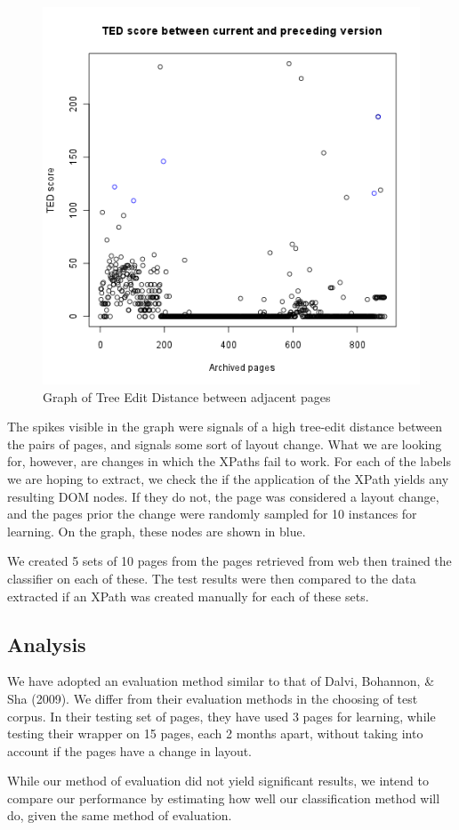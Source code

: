 \begin{figure}[htbp]
\centering
\includegraphics[scale=0.6]{scoregraph.png} 
\caption{Graph of Tree Edit Distance between adjacent pages}
\label{fig:scoregraph}
\end{figure}

	The spikes visible in the graph were signals of a high tree-edit distance between the pairs
of pages, and signals some sort of layout change. What we are looking for, however, are changes
in which the XPaths fail to work. For each of the labels we are hoping to extract, we check the
if the application of the XPath yields any resulting DOM nodes. If they do not, the page was
considered a layout change, and the pages prior the change were randomly sampled for 10 instances
for learning. On the graph, these nodes are shown in blue.

	 We created 5 sets of 10 pages from the pages retrieved from web
then trained the classifier on each of these. The test results were then compared to the data
extracted if an XPath was created manually for each of these sets.
 
 
\subsection{Analysis} 
	We have adopted an evaluation method similar to that of Dalvi, Bohannon, \& Sha (2009).
We differ from their evaluation methods in the choosing of test corpus. In their testing
set of pages, they have used 3 pages for learning, while testing their wrapper on 15 pages,
each 2 months apart, without taking into account if the pages have a change in layout.

	While our method of evaluation did not yield significant results, we intend to compare
our performance by estimating how well our classification method will do, given the same
method of evaluation.